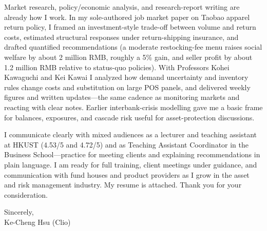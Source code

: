 \documentclass[11pt,letterpaper]{article}
\begin{document}
Market research, policy/economic analysis, and research-report writing are already how I work. In my sole-authored job market paper on Taobao apparel return policy, I framed an investment-style trade-off between volume and return costs, estimated structural responses under return-shipping insurance, and drafted quantified recommendations (a moderate restocking-fee menu raises social welfare by about 2 million RMB, roughly a 5\% gain, and seller profit by about 1.2 million RMB relative to status-quo policies). With Professors Kohei Kawaguchi and Kei Kawai I analyzed how demand uncertainty and inventory rules change costs and substitution on large POS panels, and delivered weekly figures and written updates---the same cadence as monitoring markets and reacting with clear notes. Earlier interbank-crisis modelling gave me a basic frame for balances, exposures, and cascade risk useful for asset-protection discussions.

I communicate clearly with mixed audiences as a lecturer and teaching assistant at HKUST (4.53/5 and 4.72/5) and as Teaching Assistant Coordinator in the Business School---practice for meeting clients and explaining recommendations in plain language. I am ready for full training, client meetings under guidance, and communication with fund houses and product providers as I grow in the asset and risk management industry. My resume is attached. Thank you for your consideration.

\vspace{0.3em}
Sincerely,\\[0.25em]
Ke-Cheng Hsu (Clio)
\end{document}
